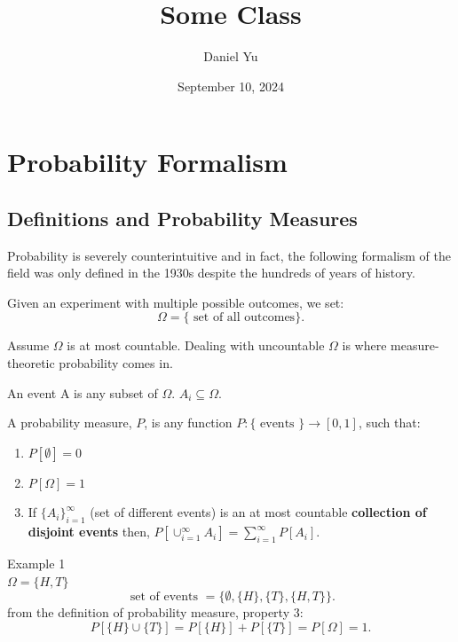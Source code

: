 \documentclass[a4paper]{article}
\title{\Huge{Some Class}}
\author{\huge{Daniel Yu}}
\date{September 10, 2024}
\begin{document}
\maketitle
\newpage%
\tableofcontents
\pagebreak

\section{Probability Formalism}
\subsection{Definitions and Probability Measures}
\begin{remark}
  Probability is severely counterintuitive and in fact, the following formalism of the field was only defined in the 1930s despite the hundreds
  of years of history.
\end{remark}

\begin{definition}
  Given an experiment with multiple possible outcomes, we set:
  \[
    \Omega = \{\text{ set of all outcomes} \}
  .\] 
\end{definition}

\begin{remark}
  Assume $\Omega$ is at most countable. Dealing with uncountable $\Omega$ is where measure-theoretic probability comes in.
\end{remark}

\begin{definition}
  An event A is any subset of $\Omega$. $A_i \subseteq \Omega$.
\end{definition}

\begin{definition}
  A probability measure, $P$, is any function $P: \{ \text{ events } \} \to [0,1]$, such that:
  \begin{enumerate}
    \item $P[\emptyset] = 0$
    \item  $P[\Omega] = 1$
    \item If $\{A_i\}_{i=1}^\infty$ (set of different events) is an at most countable \textbf{collection of disjoint events} then, $P[\cup_{i=1}^\infty 
      A_i] = \sum_{i=1}^{\infty} P[A_i]$.
  \end{enumerate} 
\end{definition}

\begin{note}{Example 1} 
  \\
  $\Omega = \{H , T\}$ 
  \[
    \text{ set of events } = \{ \emptyset, \{H\}, \{T\}, \{H,T\} \} 
  .\] 
  from the definition of probability measure, property 3:
  \[
    P[\{H\} \cup \{T\}] = P[\{H\}] + P[\{T\}] = P[\Omega] = 1    
  .\] 
  
\end{note}
\end{document}
